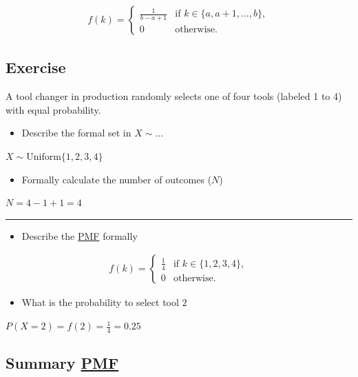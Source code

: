 \documentclass[
  a4paper,
]{scrbook}
\providecommand{\tightlist}{%
  \setlength{\itemsep}{0pt}\setlength{\parskip}{0pt}}\usepackage{longtable,booktabs,array}
\begin{document}
\begin{align}
f(k) = \begin{cases}
\frac{1}{b - a + 1} & \text{if } k \in \{a, a+1, \dots, b\}, \\
0 & \text{otherwise.}
\end{cases}
\end{align}

\subsection{Exercise}\label{exercise}

A tool changer in production randomly selects one of four tools (labeled
1 to 4) with equal probability.

\begin{itemize}
\tightlist
\item
  Describe the formal set in \(X \sim ...\)
\end{itemize}

\(X \sim \mathrm{Uniform}\{1,2,3,4\}\)

\begin{itemize}
\tightlist
\item
  Formally calculate the number of outcomes (\(N\))
\end{itemize}

\(N = 4-1+1 = 4\)

\begin{center}\rule{0.5\linewidth}{0.5pt}\end{center}

\begin{itemize}
\tightlist
\item
  Describe the \hyperref[acronyms_PMF]{PMF} formally
\end{itemize}

\begin{align}
f(k) = \begin{cases}
\frac{1}{4} & \text{if } k \in \{1,2,3,4\}, \\
0 & \text{otherwise.}
\end{cases}
\end{align}

\begin{itemize}
\tightlist
\item
  What is the probability to select tool \(2\)
\end{itemize}

\(P(X = 2) = f(2) = \frac{1}{4} = 0.25\)

\subsection{\texorpdfstring{Summary
\hyperref[acronyms_PMF]{PMF}}{Summary PMF}}\label{summary}
\end{document}
